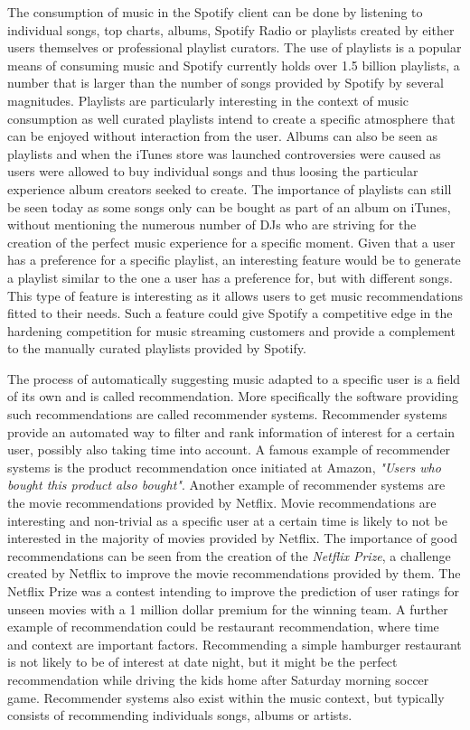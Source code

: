 \documentclass[a4paper,11pt]{kth-mag}
\begin{document}
The consumption of music in the Spotify client can be done by listening to individual songs, top charts, albums, Spotify Radio or playlists created by either users themselves or professional playlist curators. The use of playlists is a popular means of consuming music and Spotify currently holds over 1.5 billion playlists, a number that is larger than the number of songs provided by Spotify by several magnitudes\cite{spotifyPress}. Playlists are particularly interesting in the context of music consumption as well curated playlists intend to create a specific atmosphere that can be enjoyed without interaction from the user. Albums can also be seen as playlists and when the iTunes store was launched controversies were caused as users were allowed to buy individual songs and thus loosing the particular experience album creators seeked to create. The importance of playlists can still be seen today as some songs only can be bought as part of an album on iTunes, without mentioning the numerous number of DJs who are striving for the creation of the perfect music experience for a specific moment. 
Given that a user has a preference for a specific playlist, an interesting feature would be to generate a playlist similar to the one a user has a preference for, but with different songs. This type of feature is interesting as it allows users to get music recommendations fitted to their needs. Such a feature could give Spotify a competitive edge in the hardening competition for music streaming customers and provide a complement to the manually curated playlists provided by Spotify.

The process of automatically suggesting music adapted to a specific user is a field of its own and is called recommendation. More specifically the software providing such recommendations are called recommender systems. Recommender systems provide an automated way to filter and rank information of interest for a certain user, possibly also taking time into account. A famous example of recommender systems is the product recommendation once initiated at Amazon, \textit{"Users who bought this product also bought"}. Another example of recommender systems are the movie recommendations provided by Netflix. Movie recommendations are interesting and non-trivial as a specific user at a certain time is likely to not be interested in the majority of movies provided by Netflix. The importance of good recommendations can be seen from the creation of the \textit{Netflix Prize}, a challenge created by Netflix to improve the movie recommendations provided by them. The Netflix Prize was a contest intending to improve the prediction of user ratings for unseen movies with a 1 million dollar premium for the winning team. A further example of recommendation could be restaurant recommendation, where time and context are important factors. Recommending a simple hamburger restaurant is not likely to be of interest at date night, but it might be the perfect recommendation while driving the kids home after Saturday morning soccer game. Recommender systems also exist within the music context, but typically consists of recommending individuals songs, albums or artists.
\end{document}

